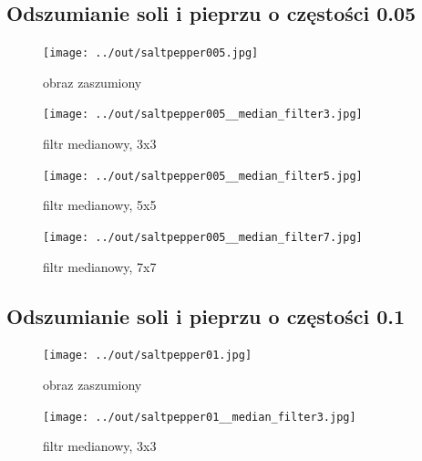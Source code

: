 \documentclass[a4paper,12pt]{article}
\begin{document}




\newpage
\subsection{Odszumianie soli i pieprzu o częstości 0.05}
\begin{figure}[h!]
\begin{minipage}[t]{7.5cm}
\begin{center}
\texttt{[image: ../out/saltpepper005.jpg]}
\caption{obraz zaszumiony}
\end{center}
\end{minipage}
\hfill
\begin{minipage}[t]{7.5cm}
\begin{center}
\texttt{[image: ../out/saltpepper005\_\_median\_filter3.jpg]}
\caption{filtr medianowy, 3x3}
\end{center}
\end{minipage}
\end{figure}

\begin{figure}[h!]
\begin{minipage}[t]{7.5cm}
\begin{center}
\texttt{[image: ../out/saltpepper005\_\_median\_filter5.jpg]}
\caption{filtr medianowy, 5x5}
\end{center}
\end{minipage}
\hfill
\begin{minipage}[t]{7.5cm}
\begin{center}
\texttt{[image: ../out/saltpepper005\_\_median\_filter7.jpg]}
\caption{filtr medianowy, 7x7}
\end{center}
\end{minipage}
\end{figure}


\newpage
\subsection{Odszumianie soli i pieprzu o częstości 0.1}
\begin{figure}[h!]
\begin{minipage}[t]{7.5cm}
\begin{center}
\texttt{[image: ../out/saltpepper01.jpg]}
\caption{obraz zaszumiony}
\end{center}
\end{minipage}
\hfill
\begin{minipage}[t]{7.5cm}
\begin{center}
\texttt{[image: ../out/saltpepper01\_\_median\_filter3.jpg]}
\caption{filtr medianowy, 3x3}
\end{center}
\end{minipage}
\end{figure}
\end{document}
